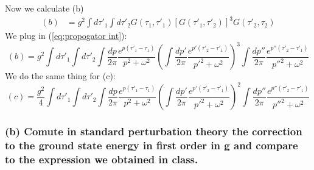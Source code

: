 \documentclass{article}
\begin{document}
Now we calculate (b)
\begin{equation*}
	\begin{split}
			(b)&= g^2\int d\tau'_1\int d\tau'_2 G(\tau_1,\tau'_1)[G(\tau'_1,\tau'_2)]^3G(\tau'_2,\tau_2)
	\end{split}
\end{equation*}
We plug in (\ref{eq:propogator int}):
\begin{equation*}
		(b) = g^2\int d \tau'_1 \int d \tau'_2 \int \frac{dp}{2\pi} \frac{e^{p(\tau'_1-\tau_1)}}{p^2+\omega^2} \left(\int \frac{dp'}{2\pi}\frac{e^{p'(\tau'_2-\tau'_1)}}{p'^2+\omega^2}\right)^3\int \frac{dp''}{2\pi}\frac{e^{p''(\tau'_2-\tau'_1)}}{p''^2+\omega^2}
\end{equation*}
We do the same thing for (c):
\begin{equation*}
	(c)= \frac{g^2}{4}\int d \tau'_1 \int d \tau'_2 \int \frac{dp}{2\pi} \frac{e^{p(\tau'_1-\tau_1)}}{p^2+\omega^2} \left(\int \frac{dp'}{2\pi}\frac{e^{p'(\tau'_2-\tau'_1)}}{p'^2+\omega^2}\right)^2\int \frac{dp''}{2\pi}\frac{e^{p''(\tau'_2-\tau'_1)}}{p''^2+\omega^2}
\end{equation*}
\subsubsection*{(b) Comute in standard perturbation theory the correction to the ground state energy in first order in
	g and compare to the expression we obtained in class.}
\end{document}
